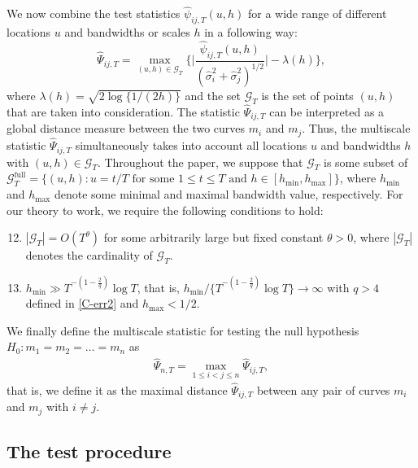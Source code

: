 \documentclass[a4paper,12pt]{article}
\begin{document}
We now combine the test statistics $\widehat{\psi}_{ij, T}(u,h)$ for a wide range of different locations $u$ and bandwidths or scales $h$ in a following way:
\[ \widehat{\Psi}_{ij,T} = \max_{(u,h) \in \mathcal{G}_T} \Big\{ \Big|\frac{\widehat{\psi}_{ij,T}(u,h)}{(\widehat{\sigma}_i^2 + \widehat{\sigma}_j^2)^{1/2}}\Big| - \lambda(h) \Big\}, \] 
where $\lambda(h) = \sqrt{2 \log \{ 1/(2h) \}}$ and the set $\mathcal{G}_T$ is the set of points $(u, h)$ that are taken into
consideration. The statistic $\widehat{\Psi}_{ij,T}$ can be interpreted as a global distance measure between the two curves $m_i$ and $m_j$. Thus, the multiscale statistic $\widehat{\Psi}_{ij, T}$ simultaneously takes into account all locations $u$ and bandwidths $h$ with $(u,h) \in \mathcal{G}_T$. Throughout the paper, we suppose that $\mathcal{G}_T$ is some subset of $\mathcal{G}_T^{\text{full}} = \{ (u,h): u = t/T \text{ for some } 1 \le t \le T \text{ and } h \in [h_{\min},h_{\max}] \}$, where $h_{\min}$ and $h_{\max}$ denote some minimal and maximal bandwidth value, respectively. For our theory to work, we require the following conditions to hold:
\begin{enumerate}[label=(C\arabic*),leftmargin=1.05cm]
\setcounter{enumi}{11}

\item \label{C-grid} $|\mathcal{G}_T| = O(T^\theta)$ for some arbitrarily large but fixed constant $\theta > 0$, where $|\mathcal{G}_T|$ denotes the cardinality of $\mathcal{G}_T$. 

\item \label{C-h} $h_{\min} \gg T^{-(1-\frac{2}{q})} \log T$, that is, $h_{\min} / \{ T^{-(1-\frac{2}{q})} \log T \} \rightarrow \infty$ with $q > 4$ defined in \ref{C-err2} and $h_{\max} < 1/2$.

\end{enumerate}

We finally define the multiscale statistic for testing the null hypothesis $H_0: m_1 =m_2 = \ldots = m_n$ as
\begin{align}\label{Psi-hat-statistic}
	\widehat{\Psi}_{n,T} = \max_{1 \le i < j \le n} \widehat{\Psi}_{ij,T},
\end{align}	
that is, we define it as the maximal distance $\widehat{\Psi}_{ij,T}$ between any pair of curves $m_i$ and $m_j$ with $i \ne j$. 

\subsection{The test procedure}\label{subsec-test-test}
\end{document}
